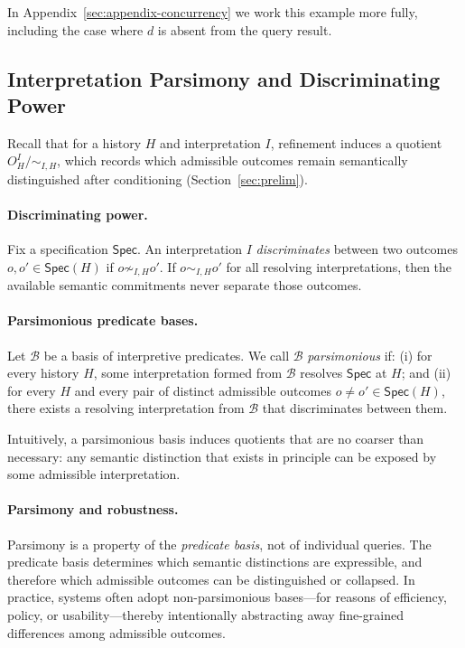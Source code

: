 \documentclass[acmsmall,nonacm]{acmart}
\theoremstyle{remark}
\numberwithin{definition}{section}
\numberwithin{theorem}{section}
\numberwithin{lemma}{section}
\numberwithin{corollary}{section}
\numberwithin{remark}{section}
\numberwithin{example}{section}
\numberwithin{observation}{section}
\numberwithin{assumption}{section}
\newcommand{\Spec}{\mathsf{Spec}}
\begin{document}
In Appendix~\ref{sec:appendix-concurrency} we work this example more fully, including 
the case where $d$ is absent from the query result.

\subsection{Interpretation Parsimony and Discriminating Power}
\label{sec:parsimony}

Recall that for a history $H$ and interpretation $I$, refinement induces a
quotient $O_H^I \big/ {\sim_{I,H}}$,
which records which admissible outcomes remain semantically distinguished after
conditioning (Section~\ref{sec:prelim}).

\paragraph{Discriminating power.}
Fix a specification $\Spec$.
An interpretation $I$ \emph{discriminates} between two outcomes
$o,o' \in \Spec(H)$ if $o \not\sim_{I,H} o'$.
If $o \sim_{I,H} o'$ for all resolving interpretations, then the available
semantic commitments never separate those outcomes.

\paragraph{Parsimonious predicate bases.}
Let $\mathcal{B}$ be a basis of interpretive predicates.
We call $\mathcal{B}$ \emph{parsimonious} if:
(i) for every history $H$, some interpretation formed from $\mathcal{B}$
resolves $\Spec$ at $H$; and
(ii) for every $H$ and every pair of distinct admissible outcomes
$o \neq o' \in \Spec(H)$, there exists a resolving interpretation from
$\mathcal{B}$ that discriminates between them.

Intuitively, a parsimonious basis induces quotients that are no coarser than
necessary: any semantic distinction that exists in principle can be exposed by
some admissible interpretation.

\paragraph{Parsimony and robustness.}
Parsimony is a property of the \emph{predicate basis}, not of individual queries.
The predicate basis determines which semantic distinctions are expressible, and
therefore which admissible outcomes can be distinguished or collapsed.
In practice, systems often adopt non-parsimonious bases—for reasons of efficiency,
policy, or usability—thereby intentionally abstracting away fine-grained
differences among admissible outcomes.
\end{document}
